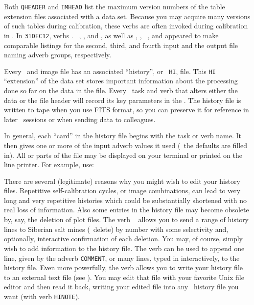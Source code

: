     Both {\tt QHEADER} and {\tt IMHEAD} list the maximum version
numbers of the table extension files associated with a data set.
Because you may acquire many versions of such tables during
calibration, these verbs are often invoked during calibration in
\hbox{\AIPS}.  In {\tt 31DEC12}, verbs {\tt {}}. {\tt
{}}, {\tt {}}, and {\tt {}}, as
well as {\tt {}}, {\tt {}}, {\tt
{}}, and {\tt {}} appeared to make
comparable  listings for the second, third, and fourth input and the
output file naming adverb groups, respectively.


     Every \uv\ and image file has an associated ``history'', or {\tt
HI}, file.  This {\tt HI} ``extension'' of the data set stores
important information about the processing done so far on the data in
the file.  Every \AIPS\ task and verb that alters either the data or
the file header will record its key parameters in the .  The history file is written to tape when you use FITS format,
so you can preserve it for reference in later \AIPS\ sessions or when
sending data to colleagues.

     In general, each ``card'' in the history file begins with the
task or verb name.  It then gives one or more of the input adverb
values it used (\ie\ the defaults are filled in).  All or parts of the
file may be displayed on your terminal or printed on the line printer.
For example, use:
\btd
{}
\etd

     There are several (legitimate) reasons why you might wish to edit
your history files.  Repetitive self-calibration cycles, or image
combinations, can lead to very long and very repetitive histories
which could be substantially shortened with no real loss of
information.  Also some entries in the history file may become
obsolete by, say, the deletion of plot files.  The verb {\tt
{}} allows you to send a range of history lines to Siberian
salt mines (\ie\ delete) by number with some selectivity and,
optionally, interactive confirmation of each deletion.  You may, of
course, simply wish to add information to the history file.  The verb
{\tt {}} can be used to append one line, given by the
adverb {\tt COMMENT}, or many lines, typed in interactively, to the
history file.  Even more powerfully, the verb {\tt {}}
allows you to write your history file to an external text file (see
).  You may edit that file with your favorite Unix file
editor and then read it back, writing your edited file into any \AIPS\
history file you want (with verb \hbox{{\tt HINOTE}}).

